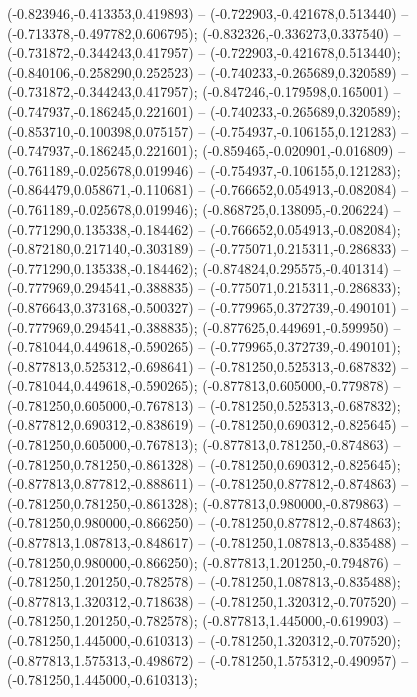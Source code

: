  (-0.823946,-0.413353,0.419893) -- (-0.722903,-0.421678,0.513440) -- (-0.713378,-0.497782,0.606795);
 (-0.832326,-0.336273,0.337540) -- (-0.731872,-0.344243,0.417957) -- (-0.722903,-0.421678,0.513440);
 (-0.840106,-0.258290,0.252523) -- (-0.740233,-0.265689,0.320589) -- (-0.731872,-0.344243,0.417957);
 (-0.847246,-0.179598,0.165001) -- (-0.747937,-0.186245,0.221601) -- (-0.740233,-0.265689,0.320589);
 (-0.853710,-0.100398,0.075157) -- (-0.754937,-0.106155,0.121283) -- (-0.747937,-0.186245,0.221601);
 (-0.859465,-0.020901,-0.016809) -- (-0.761189,-0.025678,0.019946) -- (-0.754937,-0.106155,0.121283);
 (-0.864479,0.058671,-0.110681) -- (-0.766652,0.054913,-0.082084) -- (-0.761189,-0.025678,0.019946);
 (-0.868725,0.138095,-0.206224) -- (-0.771290,0.135338,-0.184462) -- (-0.766652,0.054913,-0.082084);
 (-0.872180,0.217140,-0.303189) -- (-0.775071,0.215311,-0.286833) -- (-0.771290,0.135338,-0.184462);
 (-0.874824,0.295575,-0.401314) -- (-0.777969,0.294541,-0.388835) -- (-0.775071,0.215311,-0.286833);
 (-0.876643,0.373168,-0.500327) -- (-0.779965,0.372739,-0.490101) -- (-0.777969,0.294541,-0.388835);
 (-0.877625,0.449691,-0.599950) -- (-0.781044,0.449618,-0.590265) -- (-0.779965,0.372739,-0.490101);
 (-0.877813,0.525312,-0.698641) -- (-0.781250,0.525313,-0.687832) -- (-0.781044,0.449618,-0.590265);
 (-0.877813,0.605000,-0.779878) -- (-0.781250,0.605000,-0.767813) -- (-0.781250,0.525313,-0.687832);
 (-0.877812,0.690312,-0.838619) -- (-0.781250,0.690312,-0.825645) -- (-0.781250,0.605000,-0.767813);
 (-0.877813,0.781250,-0.874863) -- (-0.781250,0.781250,-0.861328) -- (-0.781250,0.690312,-0.825645);
 (-0.877813,0.877812,-0.888611) -- (-0.781250,0.877812,-0.874863) -- (-0.781250,0.781250,-0.861328);
 (-0.877813,0.980000,-0.879863) -- (-0.781250,0.980000,-0.866250) -- (-0.781250,0.877812,-0.874863);
 (-0.877813,1.087813,-0.848617) -- (-0.781250,1.087813,-0.835488) -- (-0.781250,0.980000,-0.866250);
 (-0.877813,1.201250,-0.794876) -- (-0.781250,1.201250,-0.782578) -- (-0.781250,1.087813,-0.835488);
 (-0.877813,1.320312,-0.718638) -- (-0.781250,1.320312,-0.707520) -- (-0.781250,1.201250,-0.782578);
 (-0.877813,1.445000,-0.619903) -- (-0.781250,1.445000,-0.610313) -- (-0.781250,1.320312,-0.707520);
 (-0.877813,1.575313,-0.498672) -- (-0.781250,1.575312,-0.490957) -- (-0.781250,1.445000,-0.610313);
